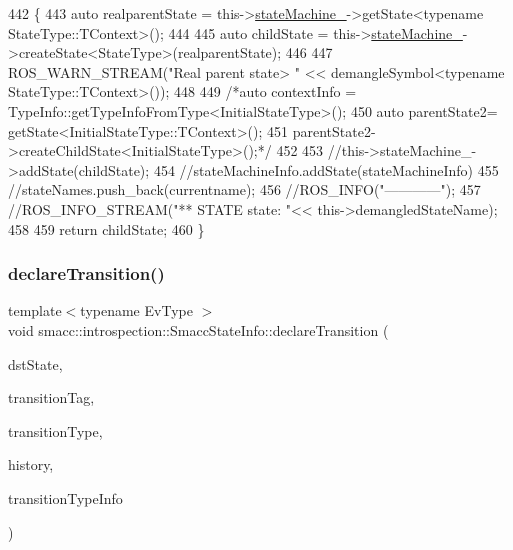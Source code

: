 \begin{DoxyCode}
442 \{
443     \textcolor{keyword}{auto} realparentState = this->\hyperlink{classsmacc_1_1introspection_1_1SmaccStateInfo_a74685e4540842ee292a80a1db44818bb}{stateMachine\_}->getState<\textcolor{keyword}{typename} StateType::TContext>();
444 
445     \textcolor{keyword}{auto} childState = this->\hyperlink{classsmacc_1_1introspection_1_1SmaccStateInfo_a74685e4540842ee292a80a1db44818bb}{stateMachine\_}->createState<StateType>(realparentState);
446 
447     ROS\_WARN\_STREAM(\textcolor{stringliteral}{"Real parent state> "} << demangleSymbol<typename StateType::TContext>());
448 
449     \textcolor{comment}{/*auto contextInfo = TypeInfo::getTypeInfoFromType<InitialStateType>();}
450 \textcolor{comment}{    auto parentState2= getState<InitialStateType::TContext>();}
451 \textcolor{comment}{    parentState2->createChildState<InitialStateType>();*/}
452 
453     \textcolor{comment}{//this->stateMachine\_->addState(childState);}
454     \textcolor{comment}{//stateMachineInfo.addState(stateMachineInfo)}
455     \textcolor{comment}{//stateNames.push\_back(currentname);}
456     \textcolor{comment}{//ROS\_INFO("------------");}
457     \textcolor{comment}{//ROS\_INFO\_STREAM("** STATE state: "<< this->demangledStateName);}
458 
459     \textcolor{keywordflow}{return} childState;
460 \}
\end{DoxyCode}
\mbox{\label{classsmacc_1_1introspection_1_1SmaccStateInfo_ac0b32e5504ccbed161ad50f0b77c2004}} 
\subsubsection{\texorpdfstring{declare\+Transition()}{declareTransition()}}
{\footnotesize\ttfamily template$<$typename Ev\+Type $>$ \\
void smacc\+::introspection\+::\+Smacc\+State\+Info\+::declare\+Transition (\begin{DoxyParamCaption}\item[{std\+::shared\+\_\+ptr$<$ \hyperlink{classsmacc_1_1introspection_1_1SmaccStateInfo}{Smacc\+State\+Info} $>$ \&}]{dst\+State,  }\item[{std\+::string}]{transition\+Tag,  }\item[{std\+::string}]{transition\+Type,  }\item[{\hyperlink{classbool}{bool}}]{history,  }\item[{\hyperlink{classsmacc_1_1introspection_1_1TypeInfo_aa6ffd9c39811d59f7c771941b7fad860}{Type\+Info\+::\+Ptr}}]{transition\+Type\+Info }\end{DoxyParamCaption})}



